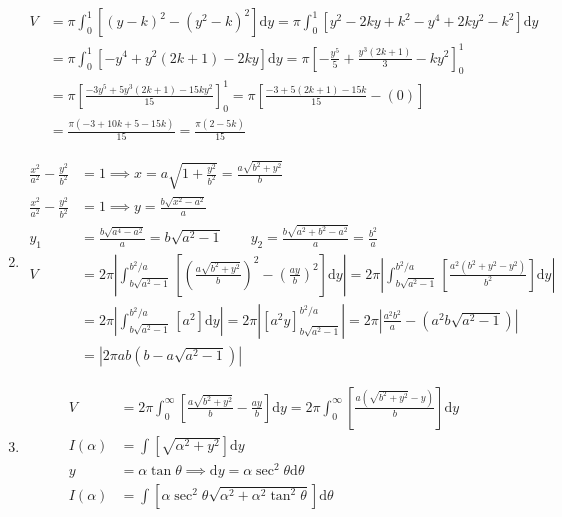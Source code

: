 \documentclass[12pt, A4]{report}
\renewcommand{\d}{\text{d}}
\begin{document}
\begin{enumerate}
\begin{align*}
						V &= \pi\int_0^1\left[(y - k)^2 - (y^2 - k)^2\right]\d y
								= \pi\int_0^1\left[y^2 - 2ky + k^2 - y^4 + 2ky^2 - k^2\right]\d y \\
							&= \pi\int_0^1\left[-y^4 + y^2(2k + 1) - 2ky\right]\d y
								= \pi\left[-\frac{y^5}{5} + \frac{y^3(2k + 1)}{3} - ky^2\right]_0^1 \\
							&= \pi\left[\frac{-3y^5 + 5y^3(2k + 1) - 15ky^2}{15}\right]_0^1
								= \pi\left[\frac{-3 + 5(2k + 1) - 15k}{15} - (0)\right] \\
							&= \frac{\pi(-3 + 10k + 5 - 15k)}{15} = \frac{\pi(2 - 5k)}{15}
					\end{align*}
				\item
					\begin{align*}
						\frac{x^2}{a^2} - \frac{y^2}{b^2} &= 1 
									\implies x = a\sqrt{1 + \frac{y^2}{b^2}}
										= \frac{a\sqrt{b^2 + y^2}}{b} \\
							\frac{x^2}{a^2} - \frac{y^2}{b^2} &= 1 \implies y 
									= \frac{b\sqrt{x^2 - a^2}}{a} \\
							y_1 &= \frac{b\sqrt{a^4 - a^2}}{a} 
									= b\sqrt{a^2 - 1} \qquad 
								y_2 = \frac{b\sqrt{a^2 + b^2 - a^2}}{a} 
									= \frac{b^2}{a} \\
						V &= 2\pi\left|\int_{b\sqrt{a^2 - 1}}^{b^2/a}\left[\left(\frac{a\sqrt{b^2 + y^2}}{b}\right)^2 - \left(\frac{ay}{b}\right)^2\right]\d y\right|
								= 2\pi\left|\int_{b\sqrt{a^2 - 1}}^{b^2/a}\left[\frac{a^2(b^2 + y^2 - y^2)}{b^2}\right]\d y\right| \\
							&= 2\pi\left|\int_{b\sqrt{a^2 - 1}}^{b^2/a}\left[a^2\right]\d y\right|
								= 2\pi\left|\left[a^2y\right]_{b\sqrt{a^2 - 1}}^{b^2/a}\right| 
								= 2\pi\left|\frac{a^2b^2}{a} - \left(a^2b\sqrt{a^2 - 1}\right)\right| \\
							&= \left|2\pi ab\left(b - a\sqrt{a^2 - 1}\right)\right|
					\end{align*}
				\item
					\begin{align*}
						V &= 2\pi\int_0^{\infty}\left[\frac{a\sqrt{b^2 + y^2}}{b} - \frac{ay}{b}\right]\d y
								= 2\pi\int_0^{\infty}\left[\frac{a\left(\sqrt{b^2 + y^2} - y\right)}{b}\right]\d y \\
						I(\alpha) &= \int\left[\sqrt{\alpha^2 + y^2}\right]\d y \\
						y &= \alpha\tan\theta  \implies \d y = \alpha\sec^2\theta\d\theta\\
						I(\alpha) &= \int\left[\alpha\sec^2\theta\sqrt{\alpha^2 + \alpha^2\tan^2\theta}\right]\d\theta 

\end{align*}
\end{enumerate}
\end{document}
